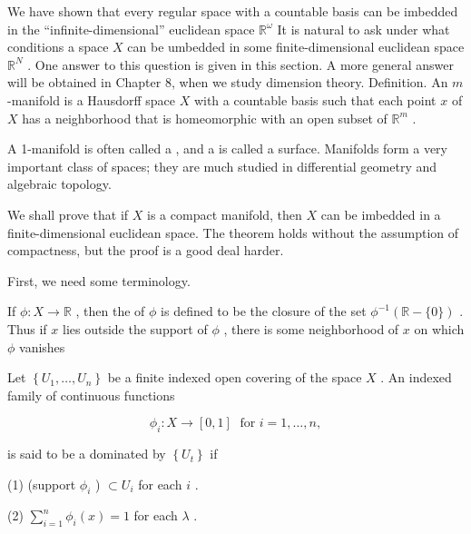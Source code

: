 We have shown that every regular space with a countable basis can be imbedded in the ``infinite-dimensional'' euclidean space \({\mathbb{R}}^{\omega }\) It is natural to ask under what conditions a space \(X\) can be umbedded in some finite-dimensional euclidean space \({\mathbb{R}}^{N}\) . One answer to this question is given in this section. A more general answer will be obtained in Chapter 8, when we study dimension theory. Definition. An \(m\) -manifold is a Hausdorff space \(X\) with a countable basis such that each point \(x\) of \(X\) has a neighborhood that is homeomorphic with an open subset of \({\mathbb{R}}^{m}\) .


A 1-manifold is often called a , and a  is called a surface. Manifolds form a very important class of spaces; they are much studied in differential geometry\cite{GuilleminPollack1974} and algebraic topology.

We shall prove that if \(X\) is a compact manifold, then \(X\) can be imbedded in a finite-dimensional euclidean space. The theorem holds without the assumption of compactness, but the proof is a good deal harder.

First, we need some terminology.

If \(\phi  : X \rightarrow  \mathbb{R}\) , then the  of \(\phi\) is defined to be the closure of the set \({\phi }^{-1}\left( {\mathbb{R}-\{ 0\} }\right)\) . Thus if \(x\) lies outside the support of \(\phi\) , there is some neighborhood of \(x\) on which \(\phi\) vanishes

\begin{definition}
	Let \(\left\{  {{U}_{1},\ldots ,{U}_{n}}\right\}\) be a finite indexed open covering of the space \(X\) . An indexed family of continuous functions

\[
{\phi }_{i} : X \rightarrow  \left\lbrack  {0,1}\right\rbrack  \;\text{ for }i = 1,\ldots ,n,
\]

is said to be a  dominated by \(\left\{  {U}_{t}\right\}\) if

(1) (support \({\phi }_{i}\) ) \(\subset  {U}_{i}\) for each \(i\) .

(2) \(\mathop{\sum }\limits_{{i = 1}}^{n}{\phi }_{i}\left( x\right)  = 1\) for each \(\lambda\) .
\end{definition}

